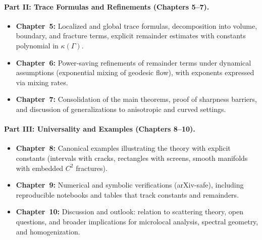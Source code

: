\paragraph{Part II: Trace Formulas and Refinements (Chapters 5–7).}
\begin{itemize}
  \item \textbf{Chapter~5:} Localized and global trace formulas, decomposition into
  volume, boundary, and fracture terms, explicit remainder estimates with constants
  polynomial in $\kappa(\Gamma)$.
  \item \textbf{Chapter~6:} Power-saving refinements of remainder terms under dynamical
  assumptions (exponential mixing of geodesic flow), with exponents expressed via
  mixing rates.
  \item \textbf{Chapter~7:} Consolidation of the main theorems, proof of sharpness
  barriers, and discussion of generalizations to anisotropic and curved settings.
\end{itemize}

\paragraph{Part III: Universality and Examples (Chapters 8–10).}
\begin{itemize}
  \item \textbf{Chapter~8:} Canonical examples illustrating the theory with explicit
  constants (intervals with cracks, rectangles with screens, smooth manifolds with
  embedded $C^2$ fractures).
  \item \textbf{Chapter~9:} Numerical and symbolic verifications (arXiv-safe),
  including reproducible notebooks and tables that track constants and remainders.
  \item \textbf{Chapter~10:} Discussion and outlook: relation to scattering theory,
  open questions, and broader implications for microlocal analysis, spectral geometry,
  and homogenization.
\end{itemize}

